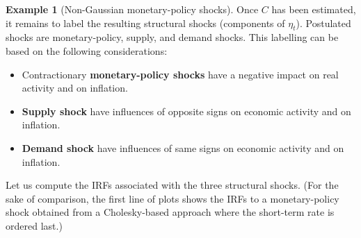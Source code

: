 \documentclass[
  11pt,
]{book}
\providecommand{\tightlist}{%
  \setlength{\itemsep}{0pt}\setlength{\parskip}{0pt}}
\theoremstyle{definition}
\theoremstyle{definition}
\newtheorem{example}{Example}[chapter]
\theoremstyle{definition}
\theoremstyle{definition}
\theoremstyle{remark}
\begin{document}
\begin{example}[Non-Gaussian monetary-policy shocks]
Once \(C\) has been estimated, it remains to label the resulting structural shocks (components of \(\eta_{t}\)). Postulated shocks are monetary-policy, supply, and demand shocks. This labelling can be based on the following considerations:

\begin{itemize}
\tightlist
\item
  Contractionary \textbf{monetary-policy shocks} have a negative impact on real activity and on inflation.
\item
  \textbf{Supply shock} have influences of opposite signs on economic activity and on inflation.
\item
  \textbf{Demand shock} have influences of same signs on economic activity and on inflation.
\end{itemize}

Let us compute the IRFs associated with the three structural shocks. (For the sake of comparison, the first line of plots shows the IRFs to a monetary-policy shock obtained from a Cholesky-based approach where the short-term rate is ordered last.)


\end{example}
\end{document}
